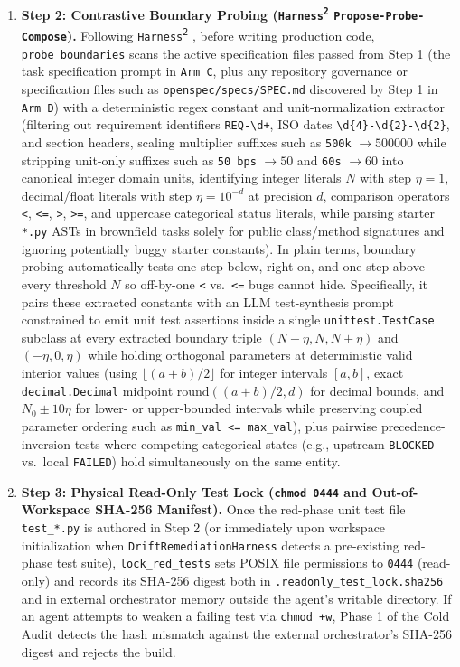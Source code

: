 \documentclass[11pt,a4paper,copyright]{google}
\begin{document}
\begin{enumerate}[leftmargin=1.5em,itemsep=3pt,topsep=3pt]
  \item \textbf{Step 2: Contrastive Boundary Probing (\texttt{Harness\textsuperscript{2}} \texttt{Propose-Probe-Compose}).} Following \texttt{Harness\textsuperscript{2}} \cite{xu2026harness2}, before writing production code, \texttt{probe\_boundaries} scans the active specification files passed from Step 1 (the task specification prompt in \texttt{Arm C}, plus any repository governance or specification files such as \texttt{openspec/specs/SPEC.md} discovered by Step 1 in \texttt{Arm D}) with a deterministic regex constant and unit-normalization extractor (filtering out requirement identifiers \texttt{REQ-\textbackslash d+}, ISO dates \texttt{\textbackslash d\{4\}-\textbackslash d\{2\}-\textbackslash d\{2\}}, and section headers, scaling multiplier suffixes such as \texttt{500k} $\to 500000$ while stripping unit-only suffixes such as \texttt{50 bps} $\to 50$ and \texttt{60s} $\to 60$ into canonical integer domain units, identifying integer literals $N$ with step $\eta = 1$, decimal/float literals with step $\eta = 10^{-d}$ at precision $d$, comparison operators \texttt{<}, \texttt{<=}, \texttt{>}, \texttt{>=}, and uppercase categorical status literals, while parsing starter \texttt{*.py} ASTs in brownfield tasks solely for public class/method signatures and ignoring potentially buggy starter constants). In plain terms, boundary probing automatically tests one step below, right on, and one step above every threshold $N$ so off-by-one \texttt{<} vs.\ \texttt{<=} bugs cannot hide. Specifically, it pairs these extracted constants with an LLM test-synthesis prompt constrained to emit unit test assertions inside a single \texttt{unittest.TestCase} subclass at every extracted boundary triple $(N - \eta, N, N + \eta)$ and $(-\eta, 0, \eta)$ while holding orthogonal parameters at deterministic valid interior values (using $\lfloor(a+b)/2\rfloor$ for integer intervals $[a, b]$, exact \texttt{decimal.Decimal} midpoint $\text{round}((a+b)/2, d)$ for decimal bounds, and $N_0 \pm 10\eta$ for lower- or upper-bounded intervals while preserving coupled parameter ordering such as \texttt{min\_val <= max\_val}), plus pairwise precedence-inversion tests where competing categorical states (e.g., upstream \texttt{BLOCKED} vs.\ local \texttt{FAILED}) hold simultaneously on the same entity.
  \item \textbf{Step 3: Physical Read-Only Test Lock (\texttt{chmod 0444} and Out-of-Workspace SHA-256 Manifest).} Once the red-phase unit test file \texttt{test\_*.py} is authored in Step 2 (or immediately upon workspace initialization when \texttt{DriftRemediationHarness} detects a pre-existing red-phase test suite), \texttt{lock\_red\_tests} sets POSIX file permissions to \texttt{0444} (read-only) and records its SHA-256 digest both in \texttt{.readonly\_test\_lock.sha256} and in external orchestrator memory outside the agent's writable directory. If an agent attempts to weaken a failing test via \texttt{chmod +w}, Phase 1 of the Cold Audit detects the hash mismatch against the external orchestrator's SHA-256 digest and rejects the build.

\end{enumerate}
\end{document}
